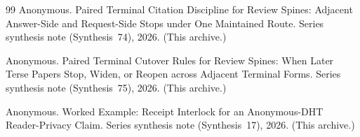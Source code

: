 \documentclass[11pt]{article}
\begin{document}
\begin{thebibliography}{99}
Anonymous.
\newblock Paired Terminal Citation Discipline for Review Spines: Adjacent Answer-Side and Request-Side Stops under One Maintained Route.
\newblock Series synthesis note (Synthesis~74), 2026. (This archive.)

Anonymous.
\newblock Paired Terminal Cutover Rules for Review Spines: When Later Terse Papers Stop, Widen, or Reopen across Adjacent Terminal Forms.
\newblock Series synthesis note (Synthesis~75), 2026. (This archive.)

Anonymous.
\newblock Worked Example: Receipt Interlock for an Anonymous-DHT Reader-Privacy Claim.
\newblock Series synthesis note (Synthesis~17), 2026. (This archive.)

\end{thebibliography}
\end{document}
